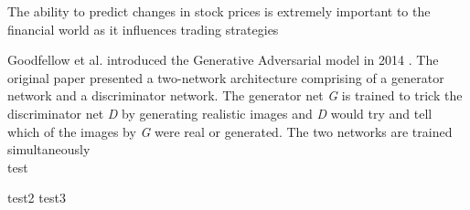 The ability to predict changes in stock prices is extremely important to the financial world as it influences trading strategies


Goodfellow et al. introduced the Generative Adversarial model in 2014 \cite{gan_original}. 
The original paper presented a two-network architecture comprising of a generator network and a discriminator network. The generator net \textit{G} is trained to trick the discriminator net \textit{D} by generating realistic images and \textit{D} would try and tell which of the images by \textit{G} were real or generated. The two networks are trained simultaneously
\\
test

test2
test3